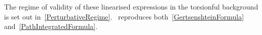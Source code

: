 The regime of validity of these
linearised expressions in the torsionful background is set out
in~\cref{PerturbativeRegime}.~ reproduces
both~\cref{GertsenshteinFormula} and~\cref{PathIntegratedFormula}.

